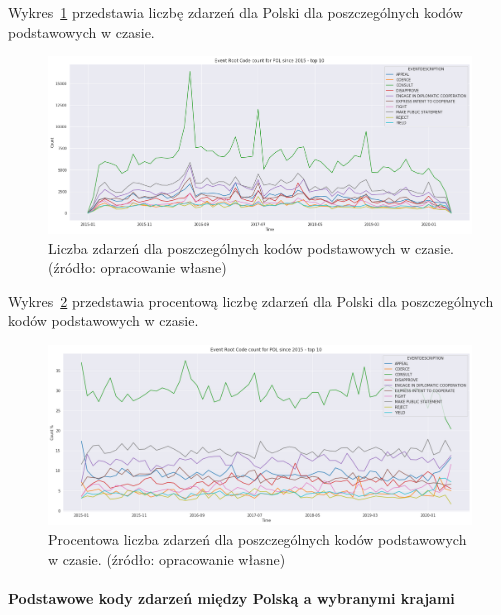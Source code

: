 \documentclass[11pt]{report}
\begin{document}
    Wykres~\ref{fig:PLPERCinTIME} przedstawia liczbę zdarzeń dla Polski dla poszczególnych kodów podstawowych w czasie.
    \begin{figure}[!htp]
        \centering
        \includegraphics[width=1 \textwidth]{fig/PL/PLERCinTIME.png}
        \caption{Liczba zdarzeń dla poszczególnych kodów podstawowych w czasie. (źródło: opracowanie własne)}
        \label{fig:PLPERCinTIME}
    \end{figure}

    Wykres~\ref{fig:PLPERCpercinTIME} przedstawia procentową liczbę zdarzeń dla Polski dla poszczególnych kodów podstawowych w czasie.
    \begin{figure}[!htp]
        \centering
        \includegraphics[width=1 \textwidth]{fig/PL/PLERCpercinTIME.png}
        \caption{Procentowa liczba zdarzeń dla poszczególnych kodów podstawowych w czasie. (źródło: opracowanie własne)}
        \label{fig:PLPERCpercinTIME}
    \end{figure}

    \paragraph{Podstawowe kody zdarzeń między Polską a wybranymi krajami}
\end{document}
